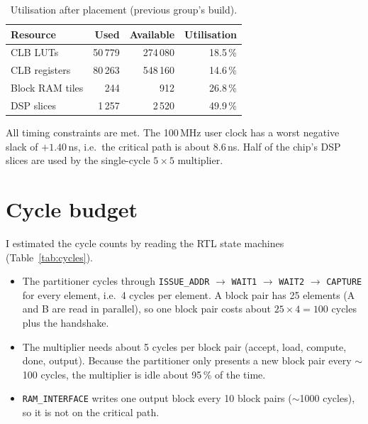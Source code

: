\documentclass[11pt,a4paper]{article}
\newcommand{\code}[1]{\texttt{#1}}
\begin{document}
\begin{table}[h]
\centering
\begin{tabular}{@{}lrrr@{}}
\toprule
\textbf{Resource} & \textbf{Used} & \textbf{Available} & \textbf{Utilisation} \\
\midrule
CLB LUTs        & 50\,779 & 274\,080 & 18.5\,\% \\
CLB registers   & 80\,263 & 548\,160 & 14.6\,\% \\
Block RAM tiles & 244     & 912      & 26.8\,\% \\
DSP slices      & 1\,257  & 2\,520   & 49.9\,\% \\
\bottomrule
\end{tabular}
\caption{Utilisation after placement (previous group's build).}
\end{table}

All timing constraints are met. The 100\,MHz user clock has a worst negative slack of $+1.40$\,ns, i.e.\ the critical path is about 8.6\,ns. Half of the chip's DSP slices are used by the single-cycle $5\times5$ multiplier.

\section{Cycle budget}
I estimated the cycle counts by reading the RTL state machines (Table~\ref{tab:cycles}).

\begin{itemize}
  \item The partitioner cycles through \code{ISSUE\_ADDR} $\rightarrow$ \code{WAIT1} $\rightarrow$ \code{WAIT2} $\rightarrow$ \code{CAPTURE} for every element, i.e.\ 4 cycles per element. A block pair has 25 elements (A and B are read in parallel), so one block pair costs about $25 \times 4 = 100$ cycles plus the handshake.
  \item The multiplier needs about 5 cycles per block pair (accept, load, compute, done, output). Because the partitioner only presents a new block pair every $\sim$100 cycles, the multiplier is idle about 95\,\% of the time.
  \item \code{RAM\_INTERFACE} writes one output block every 10 block pairs ($\sim$1000 cycles), so it is not on the critical path.
\end{itemize}
\end{document}
